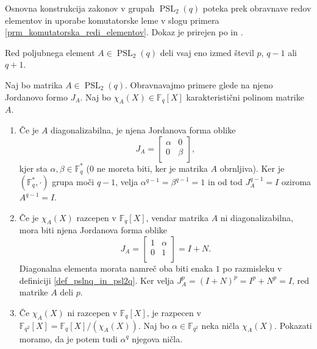     Osnovna konstrukcija zakonov v grupah $\operatorname{PSL}_2(q)$ poteka prek obravnave redov elementov in uporabe komutatorske leme v slogu primera \ref{prm_komutatorska_redi_elementov}.
    Dokaz je prirejen po \cite[str.~36--37]{Schneider_2016} in \cite{Jezernik_2023}.
    \begin{lema}
    \label{lem_redi_elementov_v_psl2q}
    Red poljubnega element $A \in  \operatorname{PSL}_2(q)$ deli vsaj eno izmed števil $p$, $q-1$ ali $q + 1$. 
    \end{lema}
    \begin{dokaz}
    Naj bo matrika $A \in \operatorname{PSL}_2(q)$. Obravnavajmo primere glede na njeno Jordanovo formo $J_A$. Naj bo $\chi_A(X) \in \mathbb{F}_q[X]$ karakteristični polinom matrike $A$. 
    \begin{enumerate}
        \item Če je $A$ diagonalizabilna, je njena Jordanova forma oblike \begin{equation*}
        J_A = \begin{bmatrix}
            \alpha & 0 \\
            0 & \beta \\
        \end{bmatrix},
        \end{equation*}  
          kjer sta $\alpha, \beta \in  \mathbb{F}_q^{*}$ (0 ne moreta biti, ker je matrika $A$ obrnljiva). Ker je $(\mathbb{F}_q^{*}, \cdot)$ grupa moči $q-1$, velja $\alpha^{q-1} = \beta^{q -1} = 1$ in od tod $J_A^{q-1} = I$ oziroma $A^{q-1} = I$.
          \item Če je $\chi_A(X)$ razcepen v $\mathbb{F}_q[X]$, vendar matrika $A$ ni diagonalizabilna, mora biti njena Jordanova forma oblike \begin{equation*}
          J_A =  \begin{bmatrix}
            1 & \alpha\\
            0 & 1\\
          \end{bmatrix} = I + N.
          \end{equation*}  
        Diagonalna elementa morata namreč oba biti enaka $1$ po razmisleku v definiciji \ref{def_pslnq_in_psl2q}. Ker velja $J_A^{p} = (I + N)^{p} = I^{p} + N^{p} = I$, red matrike $A$ deli $p$.  
    \item Če $\chi_A(X)$ ni razcepen v $\mathbb{F}_q[X]$, je razpecen v  $\mathbb{F}_{q^2}[X] = \mathbb{F}_q[X] / (\chi_A(X))$. Naj bo $\alpha \in \mathbb{F}_{q^2}$ neka ničla $\chi_A(X)$. Pokazati moramo, da je potem tudi $\alpha^q$ njegova ničla.

\end{enumerate}
\end{dokaz}
